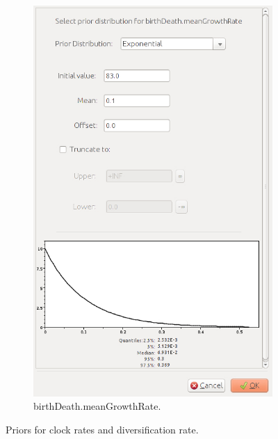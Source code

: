 {\begin{figure}[htbp]
        \begin{subfigure}[b]{0.325\textwidth}
            \includegraphics[width=\textwidth]{../screenshots/beauti-prior-birthrate.jpg}
            \caption{birthDeath.meanGrowthRate.}
            \label{fig:beautiPriorsBirthRate}
        \end{subfigure}
        \caption{Priors for clock rates and diversification rate.}
        \label{fig:beautiPriorsClocks}
    \end{figure}

}

